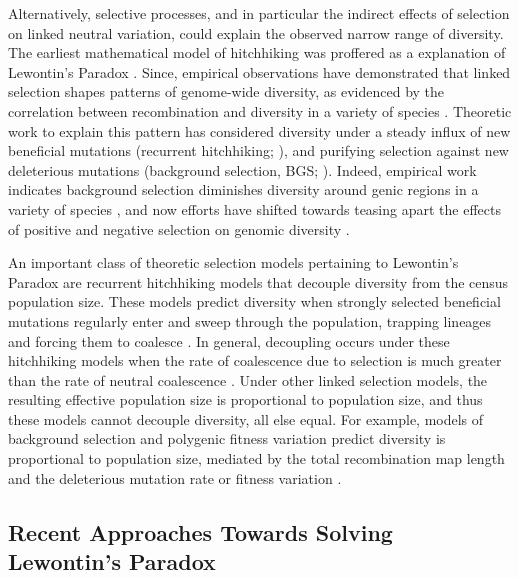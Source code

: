\documentclass[9pt,lineno]{elife}
\begin{document}
Alternatively, selective processes, and in particular the indirect effects of
selection on linked neutral variation, could explain the observed narrow range
of diversity. The earliest mathematical model of hitchhiking was proffered as a
explanation of Lewontin's Paradox \citep{Maynard_Smith1974-zr}.  Since,
empirical observations have demonstrated that linked selection shapes patterns
of genome-wide diversity, as evidenced by the correlation between recombination
and diversity in a variety of species
\citep{Aguade1989-jx,Begun1992-ey,Cutter2003-tl,Stephan1998-hh,Cai2009-by}.
Theoretic work to explain this pattern has considered diversity under a steady
influx of new beneficial mutations (recurrent hitchhiking;
\cite{Stephan1992-jc,Stephan1995-ry}), and purifying selection against new
deleterious mutations (background selection, BGS;
\cite{Charlesworth1993-gb,Nordborg1996-nq,Hudson1994-oh,Hudson1995-xc}).
Indeed, empirical work indicates background selection diminishes diversity
around genic regions in a variety of species
\citep{McVicker2009-ax,Hernandez2011-gs,Charlesworth1996-px}, and now
efforts have shifted towards teasing apart the effects of positive and negative
selection on genomic diversity \citep{Elyashiv2016-vt}.

An important class of theoretic selection models pertaining to Lewontin's
Paradox are recurrent hitchhiking models that decouple diversity from the
census population size. These models predict diversity when strongly selected
beneficial mutations regularly enter and sweep through the population, trapping
lineages and forcing them to coalesce
\citep{Kaplan1989-sc,Gillespie2000-mh}. In general, decoupling occurs under
these hitchhiking models when the rate of coalescence due to selection is much
greater than the rate of neutral coalescence \citep[e.g.][equation
22]{Coop2012-cd}. Under other linked selection models, the resulting effective
population size is proportional to population size, and thus these models
cannot decouple diversity, all else equal. For example, models of background
selection and polygenic fitness variation predict diversity is proportional to
population size, mediated by the total recombination map length and the
deleterious mutation rate or fitness variation
\citep{Charlesworth1993-gb,Nicolaisen2012-vs,Nordborg1996-nq,Robertson1961-ho,Santiago1995-hx,Santiago1998-bs}.

\subsection{Recent Approaches Towards Solving Lewontin's Paradox}
\end{document}
